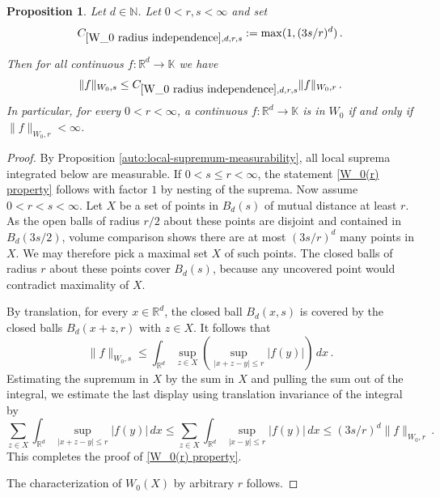 \documentclass[12pt,reqno]{amsart}
\theoremstyle{plain}
\newtheorem{proposition}[theorem]{Proposition}
\numberwithin{equation}{section}
\theoremstyle{remark}
\newcommand{\uses}[1]{}
\newcommand{\usesdefs}[1]{}
\newcommand{\R}{{\mathbb R}}
\newcommand{\N}{{\mathbb N}}
\begin{document}
\begin{proposition}\label{W_0 radius independence}\uses{auto:local-supremum-measurability}\usesdefs{closed ball,auto:Wiener-space-definition}
Let $d\in \N$.
Let $0<r,s<\infty$ and set
\begin{equation}\label{auto:Wiener-radius-comparison-constant}
    C_{\ref{W_0 radius independence},d,r,s}:=\max(1,(3s/r)^d)\, .
\end{equation}

Then for all continuous
$f:\R^d\to \mathbb{K}$ we have
\begin{equation}\label{W_0(r) property}
    \|f\|_{W_0,s}\le C_{\ref{W_0 radius independence},d,r,s}\|f\|_{W_0,r}\, .
\end{equation}
In particular, for every $0<r<\infty$, a  continuous
$f:\R^d\to \mathbb{K}$ is in $W_0$ if and only if $\|f\|_{W_0,r}<\infty$.
\end{proposition}

\begin{proof}
By Proposition \ref{auto:local-supremum-measurability}, all local suprema integrated below are measurable. If $0<s\le r<\infty$, the statement \eqref{W_0(r) property} follows with factor $1$  by nesting of the suprema. Now assume $0<r<s<\infty.$
Let $X$ be a set of points in $B_d(s)$ of
mutual distance at least $r$. As the open balls of radius $r/2$ about these points are disjoint and contained in $B_d(3s/2)$, volume comparison shows there
are at most $(3s/r)^d$ many points in $X$.
We may therefore pick a maximal set $X$ of such points. The closed balls of radius $r$ about these
points cover $B_d(s)$, because any uncovered point would contradict maximality of $X$.

By translation, for every $x\in \R^d$,
the closed ball $B_d(x,s)$ is covered by the closed balls
$B_d(x+z,r)$ with $z\in X$. It follows that
\begin{equation*}
    \|f\|_{W_0,s}\le \int_{\R^d} \sup_{z\in X} \left(\sup_{|x+z-y|\le r} |f(y)|\right)\,dx\, .
\end{equation*}
Estimating the supremum in $X$ by the sum in $X$ and pulling the sum out of the integral, we estimate the last display using translation invariance of the integral by
\begin{equation*}
         \sum_{z\in X} \int_{\R^d} \sup_{|x+z-y|\le r} |f(y)|\,dx \le \sum_{z\in X} \int_{\R^d} \sup_{|x-y|\le r} |f(y)|\,dx\le (3s/r)^d \|f\|_{W_0,r}\, .
\end{equation*}
This completes the proof of \eqref{W_0(r) property}.


The characterization of $W_0(X)$ by arbitrary $r$ follows.


\end{proof}
\end{document}
